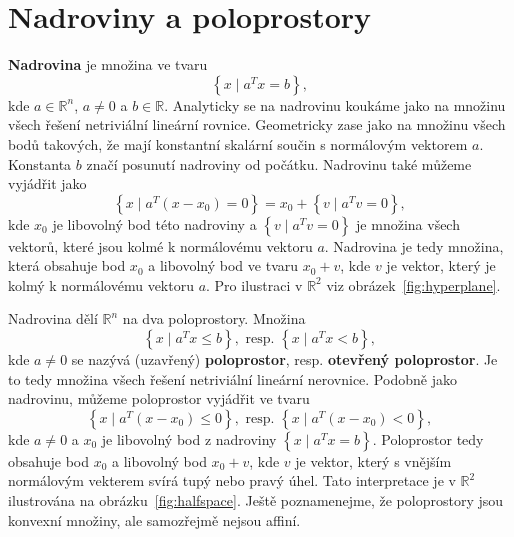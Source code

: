 \section{Nadroviny a poloprostory}

\textbf{Nadrovina} je množina ve tvaru
$$
    \left\{ x \mid a^T x = b \right\},
$$
kde $a \in \mathbb{R}^n$, $a \neq 0$ a $b \in \mathbb{R}$. Analyticky se na nadrovinu koukáme jako na množinu všech řešení netriviální lineární rovnice. Geometricky zase jako na množinu všech bodů takových, že mají konstantní skalární součin s normálovým vektorem $a$. Konstanta $b$ značí posunutí nadroviny od počátku. Nadrovinu také můžeme vyjádřit jako
$$
    \left\{ x \mid a^T (x - x_0) = 0 \right\} = x_0 + \left\{ v \mid a^T v = 0 \right\},
$$
kde $x_0$ je libovolný bod této nadroviny a $\left\{ v \mid a^T v = 0 \right\}$ je množina všech vektorů, které jsou kolmé k normálovému vektoru $a$. Nadrovina je tedy množina, která obsahuje bod $x_0$ a libovolný bod ve tvaru $x_0 + v$, kde $v$ je vektor, který je kolmý k normálovému vektoru $a$. Pro ilustraci v $\mathbb{R}^2$ viz obrázek~\ref{fig:hyperplane}.

Nadrovina dělí $\mathbb{R}^n$ na dva poloprostory. Množina 
$$
    \left\{ x \mid a^T x \leq b \right\}, \text{ resp. } \left\{ x \mid a^T x < b \right\},
$$
kde $a \neq 0$ se nazývá (uzavřený) \textbf{poloprostor}, resp. \textbf{otevřený poloprostor}. Je to tedy množina všech řešení netriviální lineární nerovnice. Podobně jako nadrovinu, můžeme poloprostor vyjádřit ve tvaru
$$
    \left\{ x \mid a^T (x - x_0) \leq 0 \right\}, \text{ resp. } \left\{ x \mid a^T (x - x_0) < 0 \right\},
$$
kde $a \neq 0$ a $x_0$ je libovolný bod z nadroviny $\left\{ x \mid a^T x = b \right\}$. Poloprostor tedy obsahuje bod $x_0$ a libovolný bod $x_0 + v$, kde $v$ je vektor, který s vnějším normálovým vekterem svírá tupý nebo pravý úhel. Tato interpretace je v $\mathbb{R}^2$ ilustrována na obrázku~\ref{fig:halfspace}. Ještě poznamenejme, že poloprostory jsou konvexní množiny, ale samozřejmě nejsou affiní.

